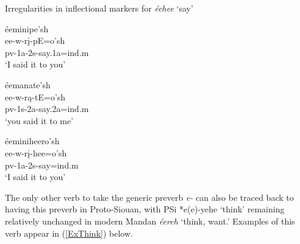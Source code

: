\begin{exe}
\item\label{irregularsay} Irregularities in inflectional markers for \textit{éehee} `say'

	\begin{xlist}
	
	\item \glll éeminipe'sh\\
	ee-w-rį-pE=o'sh\\
	pv-1a-2s-\textnormal{say}.1a=ind.m\\
	\glt `I said it to you'
	
	\item \glll éemanate'sh\\
	ee-w-rą-tE=o'sh\\
	pv-1s-2a-\textnormal{say}.2a=ind.m\\
	\glt `you said it to me'
	
	\item \glll *éeminiheero'sh\\
	ee-w-rį-hee=o'sh\\
	pv-1a-2s-\textnormal{say}=ind.m\\
	\glt `I said it to you'
	\end{xlist}

\end{exe}

The only other verb to take the generic preverb \textit{e-} can also be traced back to having this preverb in Proto-Siouan, with PSi *e(e)-yehe `think' remaining relatively unchanged in modern Mandan \textit{éereh} `think, want.' Examples of this verb appear in (\ref{ExThink}) below.

